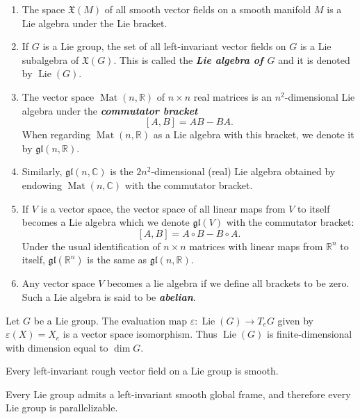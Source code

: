 \begin{example}\leavevmode
	\begin{enumerate}
		\item The space $\mathfrak{X}(M)$ of all smooth vector fields on a smooth manifold $M$ is a Lie algebra under the Lie bracket.
		\item If $G$ is a Lie group, the set of all left-invariant vector fields on $G$ is a Lie subalgebra of $\mathfrak{X}(G)$. This is called the \textbf{\textit{Lie algebra of $G$}} and it is denoted by $\operatorname{Lie}(G)$.
		\item The vector space $\operatorname{Mat}(n,\mathbb{R})$ of $n\times n$ real matrices is an $n^2$-dimensional Lie algebra under the \textbf{\textit{commutator bracket}}
		\[[A,B]=AB-BA.\]
		When regarding $\operatorname{Mat}(n,\mathbb{R})$ as a Lie algebra with this bracket, we denote it by $\mathfrak{gl}(n,\mathbb{R})$.
		\item Similarly, $\mathfrak{gl}(n,\mathbb{C})$ is the $2n^2$-dimensional (real) Lie algebra obtained by endowing $\operatorname{Mat}(n,\mathbb{C})$ with the commutator bracket.
		\item If $V$ is a vector space, the vector space of all linear maps from $V$ to itself becomes a Lie algebra which we denote $\mathfrak{gl}(V)$ with the commutator bracket:
		\[[A,B]=A\circ B-B\circ A.\]
		Under the usual identification of $n\times n$ matrices with linear maps from $\mathbb{R}^n$ to itself, $\mathfrak{gl}(\mathbb{R}^n)$ is the same as $\mathfrak{gl}(n,\mathbb{R})$.
		\item Any vector space $V$ becomes a lie algebra if we define all brackets to be zero. Such a Lie algebra is said to be \textbf{\textit{abelian}}.
	\end{enumerate}
\end{example}
\begin{thm}
	Let $G$ be a Lie group. The evaluation map $\varepsilon:\operatorname{Lie}(G)\to T_eG$ given by $\varepsilon(X)=X_e$ is a vector space isomorphism. Thus $\operatorname{Lie}(G)$ is finite-dimensional with dimension equal to $\dim G$.
\end{thm}
\begin{coro}
	Every left-invariant rough vector field on a Lie group is smooth.
\end{coro}
\begin{coro}
	Every Lie group admits a left-invariant smooth global frame, and therefore every Lie group is parallelizable.
\end{coro}
